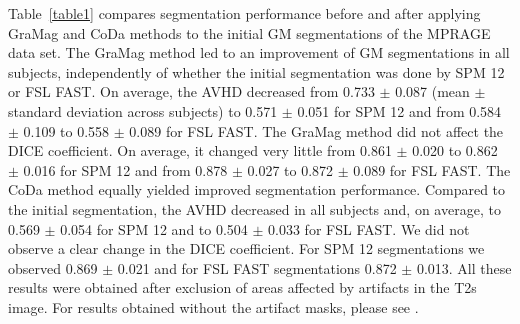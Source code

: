 Table~\ref{table1} compares segmentation performance before and after applying GraMag and CoDa methods to the initial GM segmentations of the MPRAGE data set. The GraMag method led to an improvement of GM segmentations in all subjects, independently of whether the initial segmentation was done by SPM 12 or FSL FAST. On average, the AVHD decreased from 0.733 $\pm$ 0.087 (mean $\pm$ standard deviation across subjects) to 0.571 $\pm$ 0.051 for SPM 12 and from 0.584 $\pm$ 0.109 to 0.558 $\pm$ 0.089 for FSL FAST. The GraMag method did not affect the DICE coefficient. On average, it changed very little from 0.861 $\pm$ 0.020 to 0.862 $\pm$ 0.016 for SPM 12 and from 0.878 $\pm$ 0.027 to 0.872 $\pm$ 0.089 for FSL FAST.
The CoDa method equally yielded improved segmentation performance. Compared to the initial segmentation, the AVHD decreased in all subjects and, on average, to 0.569 $\pm$ 0.054 for SPM 12 and to 0.504 $\pm$ 0.033 for FSL FAST. We did not observe a clear change in the DICE coefficient. For SPM 12 segmentations we observed 0.869 $\pm$ 0.021 and for FSL FAST segmentations 0.872 $\pm$ 0.013. All these results were obtained after exclusion of areas affected by artifacts in the T2s image. For results obtained without the artifact masks, please see .

